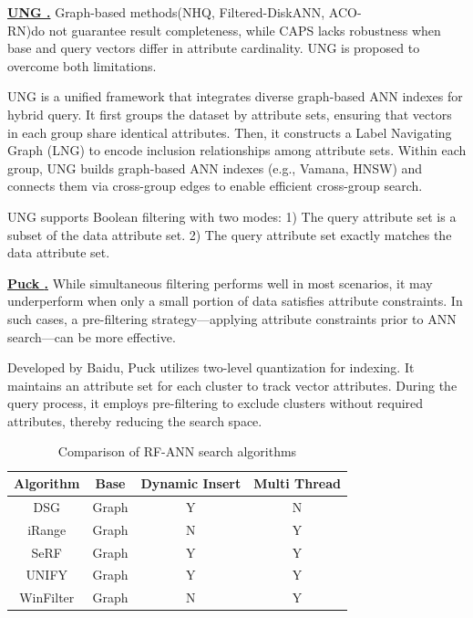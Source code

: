 \documentclass[sigconf, nonacm]{acmart}
\begin{document}
\begin{sloppypar}
\vspace{1em}
\noindent\textbf{\underline{UNG \cite{UNG}.}} 
Graph-based methods(NHQ, Filtered-DiskANN, ACO-\\RN)do not guarantee result completeness, while CAPS lacks robustness when base and query vectors differ in attribute cardinality. UNG is proposed to overcome both limitations.

UNG is a unified framework that integrates diverse graph-based ANN indexes for hybrid query. It first groups the dataset by attribute sets, ensuring that vectors in each group share identical attributes. Then, it constructs a Label Navigating Graph (LNG) to encode inclusion relationships among attribute sets. Within each group, UNG builds graph-based ANN indexes (e.g., Vamana, HNSW) and connects them via cross-group edges to enable efficient cross-group search.

UNG supports Boolean filtering with two modes:  
1) The query attribute set is a subset of the data attribute set.  
2) The query attribute set exactly matches the data attribute set.



\vspace{1em}
\noindent\textbf{\underline{Puck \cite{puck}.}}  
While simultaneous filtering performs well in most scenarios, it may underperform when only a small portion of data satisfies attribute constraints. In such cases, a pre-filtering strategy—applying attribute constraints prior to ANN search—can be more effective.

Developed by Baidu, Puck utilizes two-level quantization for indexing. It maintains an attribute set for each cluster to track vector attributes. During the query process, it employs pre-filtering to exclude clusters without required attributes, thereby reducing the search space.


\setlength{\textfloatsep}{0.1cm}
\setlength{\floatsep}{0cm}
\begin{table}[t]
	\centering
        \setlength{\abovecaptionskip}{0.05cm}
        \setlength{\textfloatsep}{0cm}
	\caption{Comparison of RF-ANN search algorithms}
	\small	%
	\label{tab:range_algo}
    \begin{tabular}{|c|c|c|c|}
		\hline
		\textbf{Algorithm} & \textbf{Base} & \textbf{Dynamic Insert} & \textbf{Multi Thread} \\
		\hline
        DSG & Graph & Y & N \\
        iRange & Graph & N & Y \\
        SeRF & Graph & Y & Y \\
		UNIFY & Graph & Y & Y \\
		WinFilter & Graph & N & Y  \\
		\hline
	\end{tabular}


\end{table}
\end{sloppypar}
\end{document}
